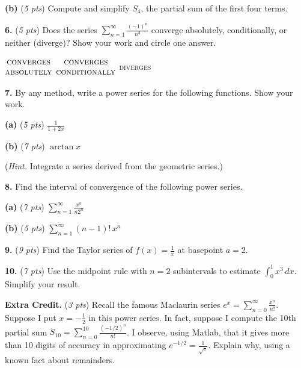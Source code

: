 \documentclass[11pt]{amsart}
\newcommand{\ds}{\displaystyle}
\newcommand{\prob}[1]{\bigskip\noindent\textbf{#1.} }
\newcommand{\pts}[1]{(\emph{#1 pts})}
\newcommand{\probpts}[2]{\prob{#1} \pts{#2} \quad}
\newcommand{\epartpts}[2]{\medskip\noindent \textbf{(#1)} \pts{#2} \quad}
\begin{document}
\epartpts{b}{5}  Compute and simplify $S_4$, the partial sum of the first four terms.
\vspace{2.0in}

\newcommand{\threeopts}{{\small \hspace{-6mm} $\begin{matrix} \text{\textsc{converges}} \\ \text{\textsc{absolutely}} \end{matrix}$ \qquad\qquad $\begin{matrix} \text{\textsc{converges}} \\ \text{\textsc{conditionally}} \end{matrix}$ \qquad\qquad \textsc{diverges}} \bigskip}

\probpts{6}{5}  Does the series $\ds \sum_{n=1}^\infty \frac{(-1)^n}{n^3}$ converge absolutely, conditionally, or neither (diverge)?  Show your work and circle one answer. 
\vfill

\threeopts


\clearpage\newpage
\prob{7}  By any method, write a power series for the following functions.  Show your work.

\epartpts{a}{5}  $\ds \frac{1}{1+2x}$
\vspace{3.0in}

\epartpts{b}{7}  $\ds \arctan x$

\medskip
\noindent (\emph{Hint.} Integrate a series derived from the geometric series.)
\vfill


\clearpage\newpage
\prob{8}  Find the interval of convergence of the following power series.

\epartpts{a}{7}  $\ds \sum_{n=1}^\infty \frac{x^n}{n 2^n}$
\vfill

\epartpts{b}{5}  $\ds \sum_{n=1}^\infty (n-1)!\,x^n$
\vfill


\clearpage\newpage
\probpts{9}{9} Find the Taylor series of $\ds f(x)=\frac{1}{x}$ at basepoint $a=2$.
\vfill

\probpts{10}{7} Use the midpoint rule with $n=2$ subintervals to estimate $\ds \int_0^1 x^3\,dx$.  Simplify your result.
\vspace{2.5in}


\clearpage\newpage
\probpts{Extra Credit}{3}  Recall the famous Maclaurin series $\ds e^x = \sum_{n=0}^\infty \frac{x^n}{n!}$.  Suppose I put $x=-\frac{1}{2}$ in this power series.  In fact, suppose I compute the 10th partial sum $\ds S_{10}=\sum_{n=0}^{10} \frac{(-1/2)^n}{n!}$.  I observe, using Matlab, that it gives more than 10 digits of accuracy in approximating $e^{-1/2}=\frac{1}{\sqrt{e}}$.  Explain why, using a known fact about remainders.
\vfill
\end{document}
